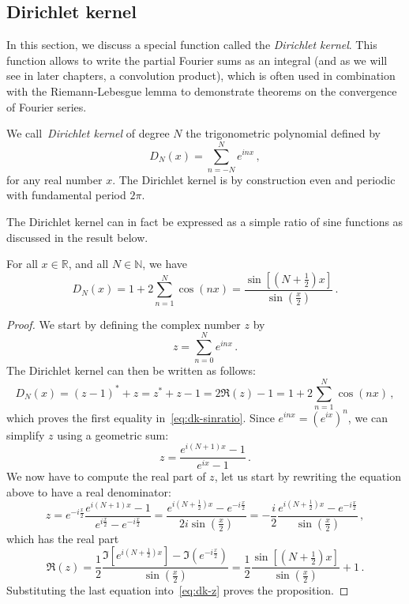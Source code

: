 \subsection{Dirichlet kernel}
In this section, we discuss a special function called the \emph{Dirichlet kernel}. This
function allows to write the partial Fourier sums as an integral (and as we will see in
later chapters, a convolution product), which is often used in combination with the
Riemann-Lebesgue lemma to demonstrate theorems on the convergence of Fourier series.
\begin{definition}
  We call~\emph{Dirichlet kernel} of degree $N$ the trigonometric polynomial defined by
  \begin{equation}
    D_N(x)=\sum_{n=-N}^{N}e^{inx}\,,\label{eq:dk-def}
  \end{equation}
  for any real number $x$. The Dirichlet kernel is by construction even and periodic with
  fundamental period $2\pi$.
\end{definition}
The Dirichlet kernel can in fact be expressed as a simple ratio of sine functions as
discussed in the result below.
\begin{proposition}
  \label{prop:dirichlet-id}
  For all $x\in\mathbb{R}$, and all $N\in\mathbb{N}$, we have
  \begin{equation}
    D_N(x)=1+2\sum_{n=1}^{N}\cos(nx)=\frac{\sin[(N+\frac{1}{2})x]}{\sin(\frac{x}{2})}\,.
    \label{eq:dk-sinratio}
  \end{equation}
\end{proposition}
\begin{proof}
  We start by defining the complex number $z$ by
  \begin{equation}
    z=\sum_{n=0}^Ne^{inx}\,.
  \end{equation}
  The Dirichlet kernel can then be written as follows:
  \begin{equation}
    D_N(x)=(z-1)^*+z=z^*+z-1=2\Re(z)-1=1+2\sum_{n=1}^{N}\cos(nx)\,,\label{eq:dk-z}
  \end{equation}
  which proves the first equality in~\cref{eq:dk-sinratio}. Since $e^{inx}=(e^{ix})^n$, we
  can simplify $z$ using a geometric sum:
  \begin{equation}
    z=\frac{e^{i(N+1)x}-1}{e^{ix}-1}\,.\label{eq:dk-geosum}
  \end{equation}
  We now have to compute the real part of $z$, let us start by rewriting the equation
  above to have a real denominator:
  \begin{equation}
    z=e^{-i\frac{x}{2}}\frac{e^{i(N+1)x}-1}{e^{i\frac{x}{2}}-e^{-i\frac{x}{2}}}
    =\frac{e^{i(N+\frac12)x}-e^{-i\frac{x}{2}}}{2i\sin(\frac{x}{2})}
    =-\frac{i}{2}\frac{e^{i(N+\frac12)x}-e^{-i\frac{x}{2}}}{\sin(\frac{x}{2})}\,,
  \end{equation}
  which has the real part
  \begin{equation}
    \Re(z)=\frac12\frac{\Im[e^{i(N+\frac12)x}]-\Im(e^{-i\frac{x}{2}})}{\sin(\frac{x}{2})}
    =\frac12\frac{\sin[(N+\frac{1}{2})x]}{\sin(\frac{x}{2})}+1\,.
  \end{equation}
  Substituting the last equation into~\cref{eq:dk-z} proves the proposition.
\end{proof}
